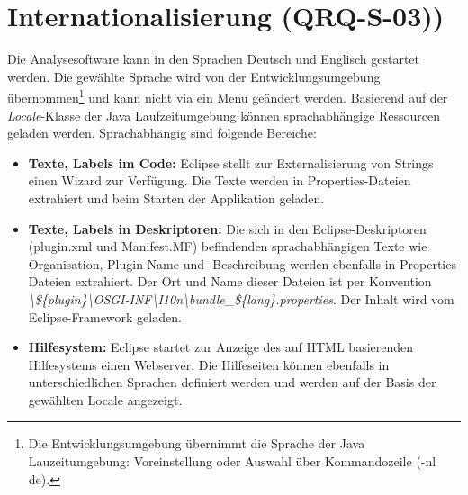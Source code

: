 \section{Internationalisierung (QRQ-S-03))}
Die Analysesoftware kann in den Sprachen Deutsch und Englisch gestartet werden. Die gewählte Sprache wird von der Entwicklungsumgebung übernommen\footnote{Die Entwicklungsumgebung übernimmt die Sprache der Java Lauzeitumgebung: Voreinstellung oder Auswahl über Kommandozeile (-nl de). } und kann nicht via ein Menu geändert werden. 
Basierend auf der \textit{Locale}-Klasse der Java Laufzeitumgebung können sprachabhängige Ressourcen geladen werden. Sprachabhängig sind folgende Bereiche:
\begin{itemize}
	\item \textbf{Texte, Labels im Code:} Eclipse stellt zur Externalisierung von Strings einen Wizard zur Verfügung. Die Texte werden in Properties-Dateien extrahiert und beim Starten der Applikation geladen.
	\item \textbf{Texte, Labels in Deskriptoren:} Die sich in den Eclipse-Deskriptoren (plugin.xml und Manifest.MF) befindenden sprachabhängigen Texte wie Organisation, Plugin-Name und -Beschreibung werden ebenfalls in Properties-Dateien extrahiert. Der Ort und Name dieser Dateien ist per Konvention \textit{\textbackslash \$\{plugin\}\textbackslash OSGI-INF\textbackslash I10n\textbackslash bundle\_\$\{lang\}.properties}. Der Inhalt wird vom Eclipse-Framework geladen.
	\item \textbf{Hilfesystem:} Eclipse startet zur Anzeige des auf HTML basierenden Hilfesystems einen Webserver. Die Hilfeseiten können ebenfalls in unterschiedlichen Sprachen definiert werden und werden auf der Basis der gewählten Locale angezeigt.
\end{itemize} 

